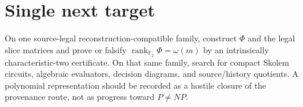 \documentclass[11pt]{article}
\begin{document}
\section*{Single next target}
On one source-legal reconstruction-compatible family, construct \(\Phi\) and the legal
slice matrices and prove or falsify \(\operatorname{rank}_{\mathbb F_2}\Phi=\omega(m)\)
by an intrinsically characteristic-two certificate. On that same family, search for compact
Skolem circuits, algebraic evaluators, decision diagrams, and source/history quotients.
A polynomial representation should be recorded as a hostile closure of the provenance route,
not as progress toward \(P\neq NP\).

\end{document}
